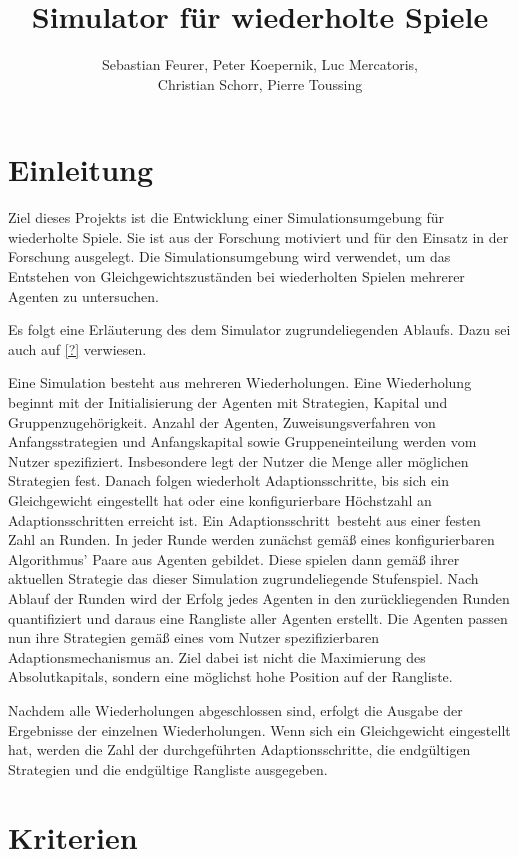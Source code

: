 \documentclass[parskip=full,11pt]{scrartcl}
\title{Simulator für wiederholte Spiele}
\author{Sebastian Feurer, Peter Koepernik, Luc Mercatoris,\\Christian Schorr, Pierre Toussing}
\def\adapt{Adaptionsschritt}
\def\adapts{Adaptionsschritte}
\begin{document}
\maketitle

\section{Einleitung}

Ziel dieses Projekts ist die Entwicklung einer Simulationsumgebung für wiederholte Spiele. Sie ist aus der Forschung motiviert und für den Einsatz in der Forschung ausgelegt. Die Simulationsumgebung wird verwendet, um das Entstehen von Gleichgewichtszuständen bei wiederholten Spielen mehrerer Agenten zu untersuchen. 

Es folgt eine Erläuterung des dem Simulator zugrundeliegenden Ablaufs. Dazu sei auch auf \cref{?} verwiesen.

Eine Simulation besteht aus mehreren Wiederholungen. Eine Wiederholung beginnt mit der Initialisierung der Agenten mit Strategien, Kapital und Gruppenzugehörigkeit. Anzahl der Agenten, Zuweisungsverfahren von Anfangsstrategien und Anfangskapital sowie Gruppeneinteilung werden vom Nutzer spezifiziert. Insbesondere legt der Nutzer die Menge aller möglichen Strategien fest. Danach folgen wiederholt \adapts, bis sich ein Gleichgewicht eingestellt hat oder eine konfigurierbare Höchstzahl an \adapts n erreicht ist. Ein \adapt\ besteht aus einer festen Zahl an Runden. In jeder Runde werden zunächst gemäß eines konfigurierbaren Algorithmus' Paare aus Agenten gebildet. Diese spielen dann gemäß ihrer aktuellen Strategie das dieser Simulation zugrundeliegende Stufenspiel. Nach Ablauf der Runden wird der Erfolg jedes Agenten in den zurückliegenden Runden quantifiziert und daraus eine Rangliste aller Agenten erstellt. Die Agenten passen nun ihre Strategien gemäß eines vom Nutzer spezifizierbaren Adaptionsmechanismus an. Ziel dabei ist nicht die Maximierung des Absolutkapitals, sondern eine möglichst hohe Position auf der Rangliste.

Nachdem alle Wiederholungen abgeschlossen sind, erfolgt die Ausgabe der Ergebnisse der einzelnen Wiederholungen. Wenn sich ein Gleichgewicht eingestellt hat, werden die Zahl der durchgeführten \adapts, die endgültigen Strategien und die endgültige Rangliste ausgegeben.

\pagebreak
\section{Kriterien}
\end{document}
